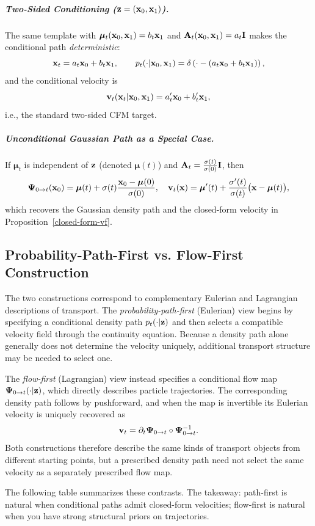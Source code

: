 \subparagraph{Two-Sided Conditioning (${\mathbf{z}}=({\mathbf{x}}_0,{\mathbf{x}}_1)$).}
The same template with $\bm\mu_t({\mathbf{x}}_0,{\mathbf{x}}_1)=b_t {\mathbf{x}}_1$ and ${\mathbf{A}}_t({\mathbf{x}}_0,{\mathbf{x}}_1)=a_t {\mathbf{I}}$ makes the conditional path \emph{deterministic}:
\[
{\mathbf{x}}_t=a_t {\mathbf{x}}_0+b_t {\mathbf{x}}_1,
\qquad
p_t(\cdot|{\mathbf{x}}_0,{\mathbf{x}}_1)=\delta\left(\cdot - (a_t{\mathbf{x}}_0+b_t{\mathbf{x}}_1)\right),
\]
and the conditional velocity is
\[
{\mathbf{v}}_t({\mathbf{x}}_t|{\mathbf{x}}_0,{\mathbf{x}}_1)=a_t' {\mathbf{x}}_0+b_t' {\mathbf{x}}_1,
\]
i.e., the standard two-sided CFM target. 

\subparagraph{Unconditional Gaussian Path as a Special Case.}
If $\bm{\mu}_t$ is independent of ${\mathbf{z}}$ (denoted $\bm{\mu}(t)$) and 
${\mathbf{A}}_t = \tfrac{\sigma(t)}{\sigma(0)} {\mathbf{I}}$, then
\[
{\bm{\Psi}}_{0\to t}({\mathbf{x}}_0)=\bm\mu(t)+\sigma(t) \frac{{\mathbf{x}}_0-\bm\mu(0)}{\sigma(0)},
\quad
{\mathbf{v}}_t({\mathbf{x}})=\bm\mu'(t)+\frac{\sigma'(t)}{\sigma(t)}\bigl({\mathbf{x}}-\bm\mu(t)\bigr),
\]
which recovers the Gaussian density path and the closed-form velocity in Proposition~\ref{closed-form-vf}.





\subsection{Probability-Path-First vs. Flow-First Construction}

The two constructions correspond to complementary Eulerian and Lagrangian
descriptions of transport. The \emph{probability-path-first} (Eulerian)
view begins by specifying a conditional density path
$p_t(\cdot|{\mathbf{z}})$ and then selects a compatible velocity field through the
continuity equation. Because a density path alone generally does not
determine the velocity uniquely, additional transport structure may be
needed to select one.

The \emph{flow-first} (Lagrangian) view instead specifies a conditional
flow map ${\bm{\Psi}}_{0\to t}(\cdot|{\mathbf{z}})$, which directly describes particle
trajectories. The corresponding density path follows by pushforward, and
when the map is invertible its Eulerian velocity is uniquely recovered as
\[
{\mathbf{v}}_t
=
\partial_t{\bm{\Psi}}_{0\to t}
\circ
{\bm{\Psi}}_{0\to t}^{-1}.
\]
Both constructions therefore describe the same kinds of transport objects
from different starting points, but a prescribed density path need not
select the same velocity as a separately prescribed flow map.

The following table summarizes these contrasts. The takeaway: path-first is natural when conditional paths admit closed-form velocities; flow-first is natural when you have strong structural priors on trajectories.


